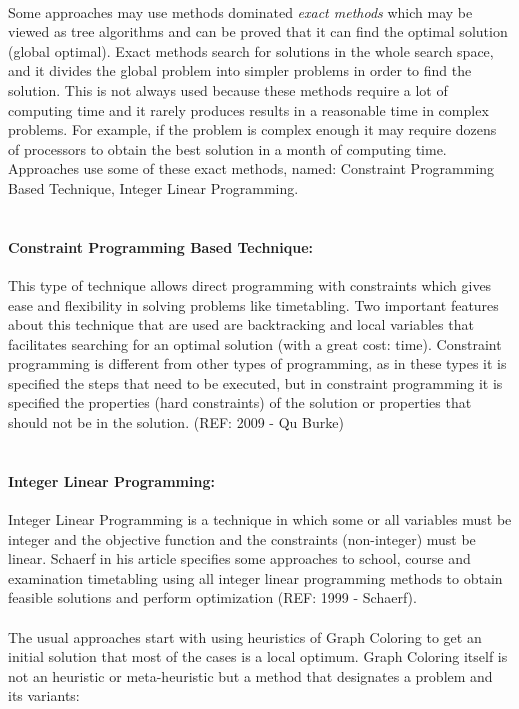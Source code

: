 \\
Some approaches may use methods dominated \textit{exact methods} which may be viewed as tree algorithms and can be proved that it can find the optimal solution (global optimal). Exact methods search for solutions in the whole search space, and it divides the global problem into simpler problems in order to find the solution. This is not always used because these methods require a lot of computing time and it rarely produces results in a reasonable time in complex problems. For example, if the problem is complex enough it may require dozens of processors to obtain the best solution in a month of computing time. Approaches use some of these exact methods, named: Constraint Programming Based Technique, Integer Linear Programming.\\
\\
\paragraph{Constraint Programming Based Technique:}
This type of technique allows direct programming with constraints which gives ease and flexibility in solving problems like timetabling. Two important features about this technique that are used are backtracking and local variables that facilitates searching for an optimal solution (with a great cost: time). Constraint programming is different from other types of programming, as in these types it is specified the steps that need to be executed, but in constraint programming it is specified the properties (hard constraints) of the solution or properties that should not be in the solution. (REF: 2009 - Qu Burke)\\
\\
\paragraph{Integer Linear Programming:}
Integer Linear Programming is a technique in which some or all variables must be integer and the objective function and the constraints (non-integer) must be linear. Schaerf in his article specifies some approaches to school, course and examination timetabling using all integer linear programming methods to obtain feasible solutions and perform optimization (REF: 1999 - Schaerf).\\
\\
The usual approaches start with using heuristics of Graph Coloring to get an initial solution that most of the cases is a local optimum. Graph Coloring itself is not an heuristic or meta-heuristic but a method that designates a problem and its variants:\\
\\
